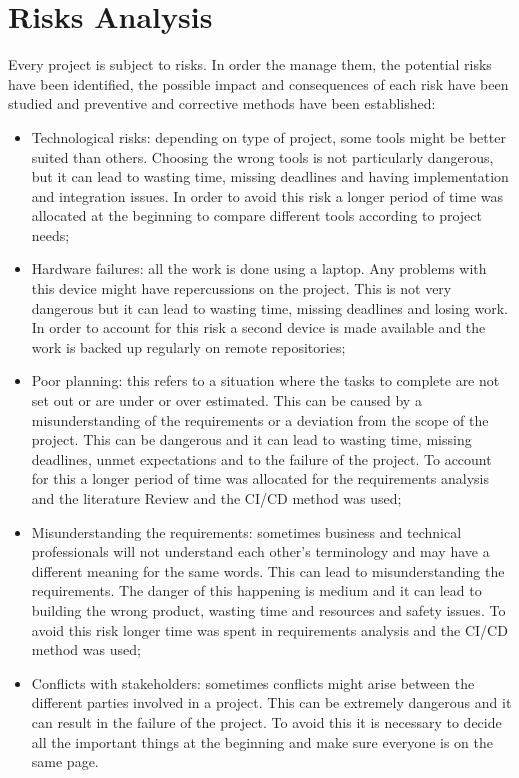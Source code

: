 \section{Risks Analysis}
Every project is subject to risks. In order the manage them, the potential risks have been identified, the possible impact and consequences of each risk have been studied and preventive and corrective methods have been established:
\begin{itemize}
	\item Technological risks: depending on type of project, some tools might be better suited than others. Choosing the wrong tools is not particularly dangerous, but it can lead to wasting time, missing deadlines and having implementation and integration issues. In order to avoid this risk a longer period of time was allocated at the beginning to compare different tools according to project needs;
	\item Hardware failures: all the work is done using a laptop. Any problems with this device might have repercussions on the project. This is not very dangerous but it can lead to wasting time, missing deadlines and losing work. In order to account for this risk a second device is made available and the work is backed up regularly on remote repositories;
	\item Poor planning: this refers to a situation where the tasks to complete are not set out or are under or over estimated. This can be caused by a misunderstanding of the requirements or a deviation from the scope of the project. This can be dangerous and it can lead to wasting time, missing deadlines, unmet expectations and to the failure of the project. To account for this a longer period of time was allocated for the requirements analysis and the  literature Review and the \ac{CI/CD} method was used;
	\item Misunderstanding the requirements: sometimes business and technical professionals will not understand each other’s terminology and may have a different meaning for the same words. This can lead to misunderstanding the requirements. The danger of this happening is medium and it can lead to building the wrong product, wasting time and resources and safety issues. To avoid this risk longer time was spent in requirements analysis and the \ac{CI/CD} method was used;
	\item Conflicts with stakeholders: sometimes conflicts might arise between the different parties involved in a project. This can be extremely dangerous and it can result in the failure of the project. To avoid this it is necessary to decide all the important things at the beginning and make sure everyone is on the same page. 
\end{itemize}


